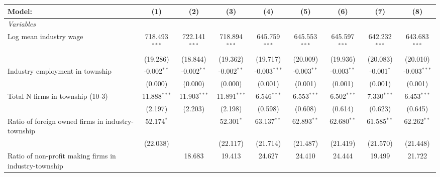 \begingroup
\centering
\begin{tabular}{lcccccccc}
   \tabularnewline \midrule \midrule
   Model:                                                & (1)             & (2)             & (3)             & (4)              & (5)              & (6)              & (7)              & (8)\\  
   \midrule
   \emph{Variables}\\
   Log mean industry wage                                & 718.493$^{***}$ & 722.141$^{***}$ & 718.894$^{***}$ & 645.759$^{***}$  & 645.553$^{***}$  & 645.597$^{***}$  & 642.232$^{***}$  & 643.683$^{***}$\\   
                                                         & (19.286)        & (18.844)        & (19.362)        & (19.717)         & (20.009)         & (19.936)         & (20.083)         & (20.010)\\   
   Industry employment in township                       & -0.002$^{**}$   & -0.002$^{**}$   & -0.002$^{**}$   & -0.003$^{***}$   & -0.003$^{**}$    & -0.003$^{**}$    & -0.001$^{*}$     & -0.003$^{***}$\\   
                                                         & (0.000)         & (0.000)         & (0.000)         & (0.001)          & (0.001)          & (0.001)          & (0.001)          & (0.001)\\   
   Total N firms in township (10-3)                      & 11.888$^{***}$  & 11.903$^{***}$  & 11.891$^{***}$  & 6.546$^{***}$    & 6.553$^{***}$    & 6.502$^{***}$    & 7.330$^{***}$    & 6.453$^{***}$\\   
                                                         & (2.197)         & (2.203)         & (2.198)         & (0.598)          & (0.608)          & (0.614)          & (0.623)          & (0.645)\\   
   Ratio of foreign owned firms in industry-township     & 52.174$^{*}$    &                 & 52.301$^{*}$    & 63.137$^{**}$    & 62.893$^{**}$    & 62.680$^{**}$    & 61.585$^{**}$    & 62.262$^{**}$\\   
                                                         & (22.038)        &                 & (22.117)        & (21.714)         & (21.487)         & (21.419)         & (21.570)         & (21.448)\\   
   Ratio of non-profit making firms in industry-township &                 & 18.683          & 19.413          & 24.627           & 24.410           & 24.444           & 19.499           & 21.722\\   

\end{tabular}
